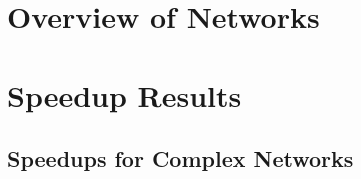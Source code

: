 
\section{Overview of Networks}
\label{sec:dyn-topk-insts}


\begin{minipage}[t]{0.48\textwidth}
\begin{table}[H]
\footnotesize
\centering
{}
\label{tab:dyn-topk-small-diam-undir}

\end{table}
\end{minipage}\hfill
\begin{minipage}[t]{0.48\textwidth}
\begin{table}[H]
\centering
\footnotesize
{}
\label{tab:dyn-topk-small-diam-dir}

\end{table}
\end{minipage}
%
\begin{minipage}[t]{0.48\textwidth}
\begin{table}[H]
\footnotesize
\centering
{}
\label{tab:dn-topk-high-diam-undir}

\end{table}
\end{minipage}\hfill
\begin{minipage}[t]{0.48\textwidth}
\begin{table}[H]
\centering
\footnotesize
{}
\label{tab:dyn-topk-high-diam-dir}

\end{table}
\end{minipage}

\newpage
\section{Speedup Results}

\subsection{Speedups for Complex Networks}
\label{sec:dyn-topk-add-exp-complex}

